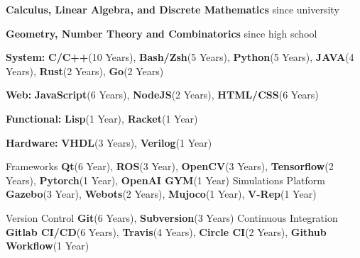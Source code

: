 




\begin{cvskills}

{
\begin{cvitems} %
      \item {\textbf{Calculus, Linear Algebra, and Discrete Mathematics} since university}
      \item {\textbf{Geometry, Number Theory and Combinatorics} since high school}
\end{cvitems}
}

{
\begin{cvitems}
      \item {\textbf{System: }\textbf{C/C++}(10 Years), \textbf{Bash/Zsh}(5 Years), \textbf{Python}(5 Years), \textbf{JAVA}(4 Years), \textbf{Rust}(2 Years), \textbf{Go}(2 Years)}
      \item {\textbf{Web: }\textbf{JavaScript}(6 Years), \textbf{NodeJS}(2 Years), \textbf{HTML/CSS}(6 Years)}
      \item {\textbf{Functional: }\textbf{Lisp}(1 Year), \textbf{Racket}(1 Year)}
      \item {\textbf{Hardware: }\textbf{VHDL}(3 Years), \textbf{Verilog}(1 Year)}
\end{cvitems}
} %

  \cvskill
    {Frameworks} %
    {\textbf{Qt}(6 Year), \textbf{ROS}(3 Year), \textbf{OpenCV}(3 Years), \textbf{Tensorflow}(2 Years), \textbf{Pytorch}(1 Year), \textbf{OpenAI GYM}(1 Year)} %
  \cvskill
    {Simulations Platform} %
    {\textbf{Gazebo}(3 Year), \textbf{Webots}(2 Years), \textbf{Mujoco}(1 Year), \textbf{V-Rep}(1 Year)} %
    
  \cvskill
    {Version Control} %
    {\textbf{Git}(6 Years), \textbf{Subversion}(3 Years)} %
  \cvskill
    {Continuous Integration} %
    {\textbf{Gitlab CI/CD}(6 Years), \textbf{Travis}(4 Years), \textbf{Circle CI}(2 Years), \textbf{Github Workflow}(1 Year)} %


\end{cvskills}
